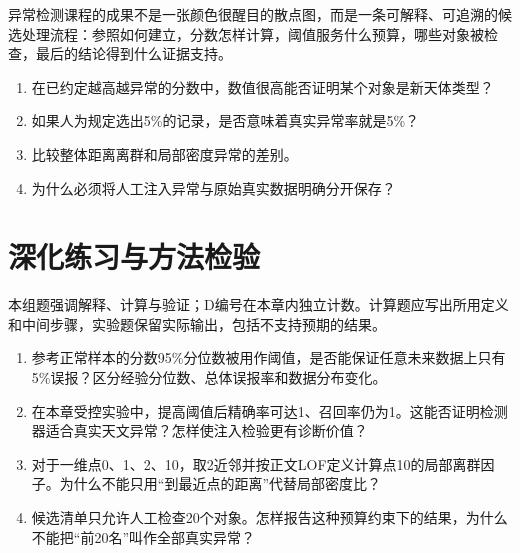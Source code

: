异常检测课程的成果不是一张颜色很醒目的散点图，而是一条可解释、可追溯的候选处理流程：参照如何建立，分数怎样计算，阈值服务什么预算，哪些对象被检查，最后的结论得到什么证据支持。

\chapterexercise
\begin{enumerate}
\item 在已约定越高越异常的分数中，数值很高能否证明某个对象是新天体类型？
\item 如果人为规定选出5\%的记录，是否意味着真实异常率就是5\%？
\item 比较整体距离离群和局部密度异常的差别。
\item 为什么必须将人工注入异常与原始真实数据明确分开保存？
\end{enumerate}

\section*{深化练习与方法检验}
本组题强调解释、计算与验证；D编号在本章内独立计数。计算题应写出所用定义和中间步骤，实验题保留实际输出，包括不支持预期的结果。
\begin{enumerate}[label=D\arabic*.]
\item 参考正常样本的分数95\%分位数被用作阈值，是否能保证任意未来数据上只有5\%误报？区分经验分位数、总体误报率和数据分布变化。
\item 在本章受控实验中，提高阈值后精确率可达1、召回率仍为1。这能否证明检测器适合真实天文异常？怎样使注入检验更有诊断价值？
\item 对于一维点0、1、2、10，取2近邻并按正文LOF定义计算点10的局部离群因子。为什么不能只用“到最近点的距离”代替局部密度比？
\item 候选清单只允许人工检查20个对象。怎样报告这种预算约束下的结果，为什么不能把“前20名”叫作全部真实异常？
\end{enumerate}
